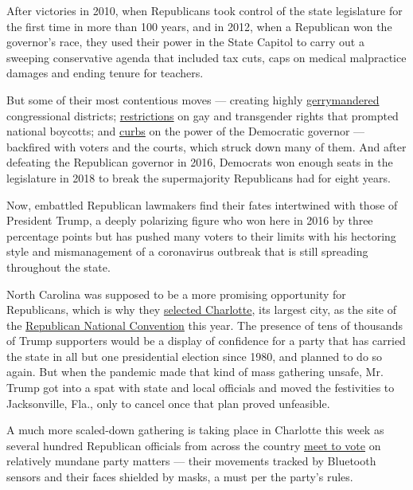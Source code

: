 After victories in 2010, when Republicans took control of the state
legislature for the first time in more than 100 years, and in 2012, when
a Republican won the governor's race, they used their power in the State
Capitol to carry out a sweeping conservative agenda that included tax
cuts, caps on medical malpractice damages and ending tenure for
teachers.

But some of their most contentious moves --- creating highly
\href{https://www.nytimes3xbfgragh.onion/interactive/2018/11/29/us/politics/north-carolina-gerrymandering.html}{gerrymandered}
congressional districts;
\href{https://www.nytimes3xbfgragh.onion/2016/03/25/us/north-carolina-law-antidiscrimination-pat-mccrory.html}{restrictions}
on gay and transgender rights that prompted national boycotts; and
\href{https://www.nytimes3xbfgragh.onion/2016/12/16/us/pat-mccrory-roy-cooper-north-carolina.html}{curbs}
on the power of the Democratic governor --- backfired with voters and
the courts, which struck down many of them. And after defeating the
Republican governor in 2016, Democrats won enough seats in the
legislature in 2018 to break the supermajority Republicans had for eight
years.

Now, embattled Republican lawmakers find their fates intertwined with
those of President Trump, a deeply polarizing figure who won here in
2016 by three percentage points but has pushed many voters to their
limits with his hectoring style and mismanagement of a coronavirus
outbreak that is still spreading throughout the state.

North Carolina was supposed to be a more promising opportunity for
Republicans, which is why they
\href{https://www.nytimes3xbfgragh.onion/2018/07/20/us/politics/republican-2020-convention-charlotte.html}{selected
Charlotte}, its largest city, as the site of the
\href{https://www.nytimes3xbfgragh.onion/2020/08/24/us/politics/how-to-watch-the-republican-national-convention.html}{Republican
National Convention} this year. The presence of tens of thousands of
Trump supporters would be a display of confidence for a party that has
carried the state in all but one presidential election since 1980, and
planned to do so again. But when the pandemic made that kind of mass
gathering unsafe, Mr. Trump got into a spat with state and local
officials and moved the festivities to Jacksonville, Fla., only to
cancel once that plan proved unfeasible.

A much more scaled-down gathering is taking place in Charlotte this week
as several hundred Republican officials from across the country
\href{https://www.nytimes3xbfgragh.onion/2020/08/22/us/politics/Republican-delegates-charlotte-trump.html}{meet
to vote} on relatively mundane party matters --- their movements tracked
by Bluetooth sensors and their faces shielded by masks, a must per the
party's rules.

